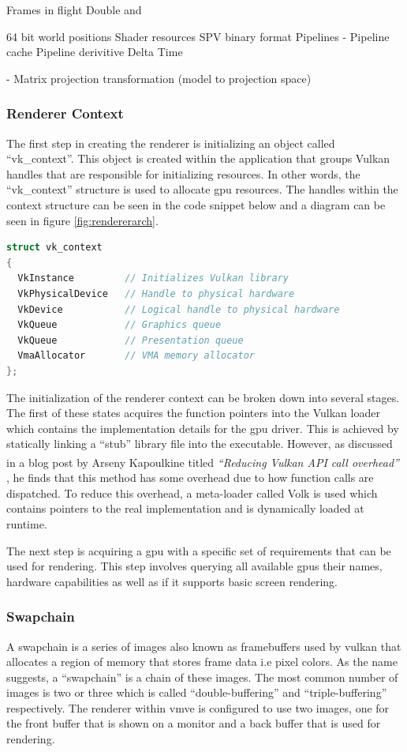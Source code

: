 \documentclass[11pt]{article}
\begin{document}
    Frames in flight 
    Double and

64 bit world positions 
Shader resources SPV binary format 
    Pipelines
-   Pipeline cache 
Pipeline derivitive 
Delta Time

- Matrix projection transformation (model to projection space)


\subsubsection{Renderer Context}
The first step in creating the renderer is initializing an object called
``vk\_context''. This object is created within the application that groups Vulkan
handles that are responsible for initializing resources. In other words, the
``vk\_context'' structure is used to allocate \gls{gpu} resources. The handles
within the context structure can be seen in the code snippet below and a diagram
can be seen in figure \ref{fig:rendererarch}.

\begin{lstlisting}[language=C++]
struct vk_context
{
  VkInstance         // Initializes Vulkan library
  VkPhysicalDevice   // Handle to physical hardware
  VkDevice           // Logical handle to physical hardware
  VkQueue            // Graphics queue
  VkQueue            // Presentation queue
  VmaAllocator       // VMA memory allocator
};
\end{lstlisting}

The initialization of the renderer context can be broken down into several
stages. The first of these states acquires the function pointers into the Vulkan
loader which contains the implementation details for the \gls{gpu} driver. This
is achieved by statically linking a ``stub'' library file into the executable.
However, as discussed in a blog post by Arseny Kapoulkine titled
\textit{``Reducing Vulkan\textsuperscript{\textregistered} API call overhead''}
\cite{volk}, he finds that this method has some overhead due to how function
calls are dispatched. To reduce this overhead, a meta-loader called Volk is used
which contains pointers to the real implementation and is dynamically loaded at
runtime.

The next step is acquiring a \gls{gpu} with a specific set of requirements that
can be used for rendering. This step involves querying all available \glspl{gpu}
their names, hardware capabilities as well as if it supports basic screen
rendering.

\subsubsection{Swapchain}
A swapchain is a series of images also known as framebuffers used by
\gls{vulkan} that allocates a region of memory that stores frame data i.e pixel
colors. As the name suggests, a ``swapchain'' is a chain of these images. The
most common number of images is two or three which is called
``double-buffering'' and ``triple-buffering'' respectively. The renderer within
\gls{vmve} is configured to use two images, one for the front buffer that is shown
on a monitor and a back buffer that is used for rendering.
\end{document}
